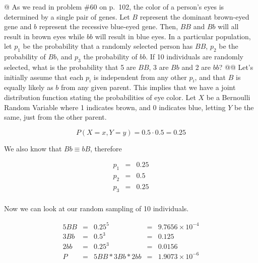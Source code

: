\documentclass[11pt]{article}\usepackage[]{graphicx}\usepackage[]{xcolor}
\begin{document}
\begin{easylist}[enumerate]
    @ As we read in problem \#60 on p.\ 102, the color of a person's eyes is determined by a single pair of genes. Let
    $B$ represent the dominant brown-eyed gene and $b$ represent the recessive blue-eyed gene. Then, $BB$ and $Bb$ will
    all result in brown eyes while $bb$ will result in blue eyes. In a particular population, let $p_1$ be the
    probability that a randomly selected person has $BB$, $p_2$ be the probability of $Bb$, and $p_3$ the probability of
    $bb$. If 10 individuals are randomly selected, what is the probability that 5 are $BB$, 3 are $Bb$ and 2 are $bb$?
    @@ Let's initially assume that each $p_i$ is independent from any other $p_i$, and that $B$ is equally likely as $b$
    from any given parent. This implies that we have a joint distribution function stating the probabilities of eye
    color. Let $X$ be a Bernoulli Random Variable where 1 indicates brown, and 0 indicates blue, letting $Y$ be the
    same, just from the other parent.

    \[
        P(X=x, Y=y) = 0.5 \cdot 0.5 = 0.25
    \]

    We also know that $Bb \equiv bB$, therefore

    \[
        \begin{aligned}
            p_1 &=& 0.25\\
            p_2 &=& 0.5\\
            p_3 &=& 0.25\\
        \end{aligned}
    \]

    Now we can look at our random sampling of 10 individuals.




    \[
        \begin{aligned}
            5BB &=& 0.25^5 &=& \ensuremath{9.7656\times 10^{-4} }\\
            3Bb &=& 0.5^3 &=& 0.125\\
            2bb &=& 0.25^3 &=& 0.0156\\
            P &=& 5BB * 3Bb * 2bb &=& \ensuremath{1.9073\times 10^{-6} }
        \end{aligned}
    \]
\end{easylist}
\end{document}
